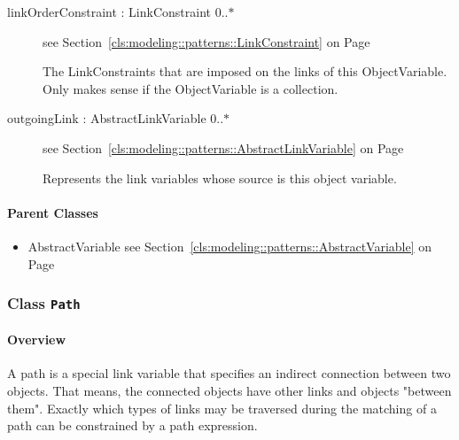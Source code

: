 \begin{description}
\begin{description}
	
		
	
\item[linkOrderConstraint : LinkConstraint 			0..$*$]
see Section~\ref{cls:modeling::patterns::LinkConstraint} on Page~\pageref{cls:modeling::patterns::LinkConstraint}
\hspace{\fill}
\nopagebreak


	
			
The LinkConstraints that are imposed on the links of this ObjectVariable. Only makes sense if the ObjectVariable is a collection.	
		
	
\item[outgoingLink : AbstractLinkVariable 			0..$*$]
see Section~\ref{cls:modeling::patterns::AbstractLinkVariable} on Page~\pageref{cls:modeling::patterns::AbstractLinkVariable}
\hspace{\fill}
\nopagebreak


	
			
Represents the link variables whose source is this object variable.	
		
	
	\end{description}
	

\end{description}

\paragraph{Parent Classes}
\begin{itemize}
\item AbstractVariable see Section~\ref{cls:modeling::patterns::AbstractVariable} on Page~\pageref{cls:modeling::patterns::AbstractVariable}\end{itemize}
\subsubsection{\Large{Class \bfseries \texttt{Path}\normalfont}}
\label{cls:modeling::patterns::Path} 
\paragraph{Overview}

	
			
A path is a special link variable that specifies an indirect connection between two objects. That means, the connected objects have other links and objects "between them". Exactly which types of links may be traversed during the matching of a path can be constrained by a path expression.	
		

